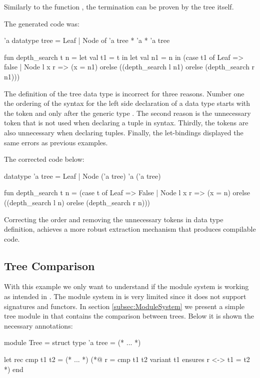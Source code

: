 Similarly to the function , the termination can be proven by the tree itself.

The generated \cml code was:

\begin{cakeml}
'a datatype tree = Leaf | Node of 'a tree * 'a * 'a tree

fun depth_search t n = let val t1 = t in
  let val n1 = n in
  (case t1 of
    Leaf => false
  | Node l x r =>
    (x = n1) orelse ((depth_search l n1) orelse (depth_search r n1)))
\end{cakeml}

The definition of the tree data type is incorrect for three reasons. Number one the ordering of the syntax for the left side declaration 
of a data type starts with the token  and only after the generic type . The second reason is the
unnecessary token  that is not used when declaring a tuple in \cml syntax. Thirdly, the tokens \inlinecode{*} are also
unnecessary when declaring tuples. Finally, the let-bindings displayed the same errors as previous examples.

The corrected code below:

\begin{cakeml}
datatype 'a tree = Leaf | Node ('a tree) 'a ('a tree)

fun depth_search t n =
  (case t of
    Leaf => False
  | Node l x r =>
    (x = n) orelse ((depth_search l n) orelse (depth_search r n)))
\end{cakeml}

Correcting the order and removing the unnecessary tokens in data type definition, achieves a more robust extraction mechanism that 
produces compilable \cml code.

\subsection{Tree Comparison}

With this example we only want to understand if the module system is working as intended in \cml. The module system in \cml is very 
limited since it does not support signatures and functors. In section \ref{subsec:ModuleSystem} we present a simple tree module in \ocaml that 
contains the comparison between trees. Below it is shown the necessary \gospel annotations:

\begin{gospell}
module Tree = struct
  type 'a tree = (* ... *)

  let rec cmp t1 t2 = (* ... *)
  (*@
  r = cmp t1 t2
  variant t1
  ensures r <-> t1 = t2
  *)
end
\end{gospell}

